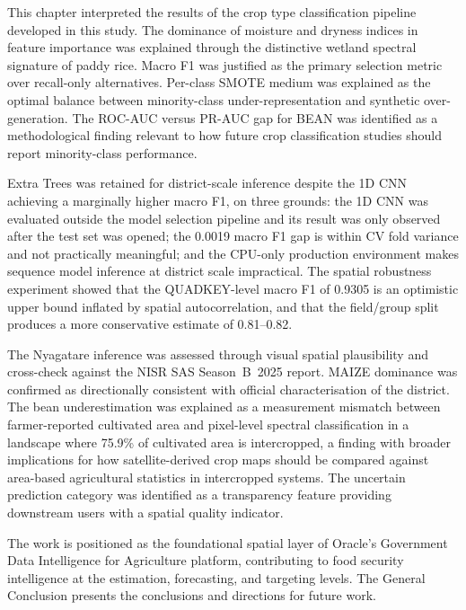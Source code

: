 This chapter interpreted the results of the crop type
classification pipeline developed in this study. The dominance
of moisture and dryness indices in feature importance was
explained through the distinctive wetland spectral signature
of paddy rice. Macro F1 was justified as the primary selection
metric over recall-only alternatives. Per-class SMOTE medium
was explained as the optimal balance between minority-class
under-representation and synthetic over-generation. The
ROC-AUC versus PR-AUC gap for BEAN was identified as a
methodological finding relevant to how future crop
classification studies should report minority-class performance.

Extra Trees was retained for district-scale inference despite
the 1D CNN achieving a marginally higher macro F1, on three
grounds: the 1D CNN was evaluated outside the model selection
pipeline and its result was only observed after the test set
was opened; the 0.0019 macro F1 gap is within CV fold variance
and not practically meaningful; and the CPU-only production
environment makes sequence model inference at district scale
impractical. The spatial robustness experiment showed that the
QUADKEY-level macro F1 of 0.9305 is an optimistic upper bound
inflated by spatial autocorrelation, and that the field/group
split produces a more conservative estimate of 0.81--0.82.

The Nyagatare inference was assessed through visual spatial
plausibility and cross-check against the NISR SAS Season~B~2025
report. MAIZE dominance was confirmed as directionally consistent
with official characterisation of the district. The bean
underestimation was explained as a measurement mismatch between
farmer-reported cultivated area and pixel-level spectral
classification in a landscape where 75.9\% of cultivated area
is intercropped, a finding with broader implications for
how satellite-derived crop maps should be compared against
area-based agricultural statistics in intercropped systems.
The uncertain prediction category was identified as a
transparency feature providing downstream users with a spatial
quality indicator.

The work is positioned as the foundational spatial layer of
Oracle's Government Data Intelligence for Agriculture platform,
contributing to food security intelligence at the estimation,
forecasting, and targeting levels.
The General Conclusion presents the conclusions and directions
for future work.
